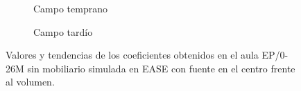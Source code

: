 \begin{figure}[H]
    \begin{subfigure}[b]{0.4\textwidth}
    	\centering%
         {%
    }
    \caption{Campo temprano}%
    \end{subfigure}%
    \hspace{1.65cm}%
    \begin{subfigure}[b]{0.4\textwidth}%
    	\centering%
        {%
    }
    \caption{Campo tardío}%
    \end{subfigure}
    \caption{Valores y tendencias de los coeficientes obtenidos en el aula EP/0-26M sin mobiliario simulada en EASE con fuente en el centro frente al volumen.}
\label{graf:coefepsearlylatecentro}%
\end{figure} 

